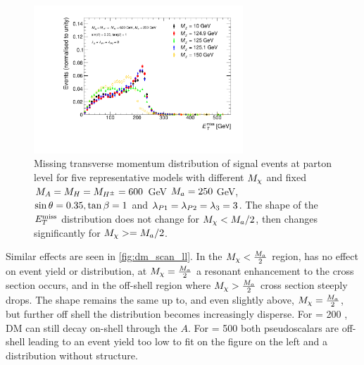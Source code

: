 \begin{figure}[tbp]
\centering
\includegraphics[width=0.7\textwidth]{texinputs/04_grid/figures/monoHbb_mDM_scan_MET_liny_norm2one.pdf}
\caption[$\MET$ distribution in \monohbb events for different $\mDM$]
{
Missing transverse momentum distribution  of \monohbb signal events at parton level for five representative models with different $\mDM$
and fixed $M_{A} = M_{H} = M_{H^{\pm}} = 600 $ GeV $M_{a} = 250$ GeV, $ \sin\theta = 0.35, \tan\beta = 1$ and $ \lambda_{P1} = \lambda_{P2} = \lambda_{3} = 3 $. 
The shape of the $\MET$ distribution does not change for $M_{\chi} < M_{a}/2$, then changes significantly for $M_{\chi}>=M_{a}/2$.
%
}
\label{fig:monoHbb_mDM_scan_met}
\end{figure}

Similar effects are seen in \autoref{fig:dm_scan_ll}. In the $M_{\chi} < \frac{M_{a}}{2}$ region, \mDM has no effect on event yield or \MET distribution, at $M_{\chi} = \frac{M_{a}}{2}$ a resonant enhancement to the cross section occurs, and in the off-shell region where  $M_{\chi} > \frac{M_{a}}{2}$ cross section steeply drops.  The \MET shape remains the same up to, and even slightly above, $M_{\chi} = \frac{M_{a}}{2}$, but further off shell the \MET distribution becomes increasingly disperse.  For \mDM = 200 \GeV, DM can still decay on-shell through the $A$.  For \mDM = 500 \GeV both pseudoscalars are off-shell leading to an event yield too low to fit on the figure on the left and a \MET distribution without structure.

